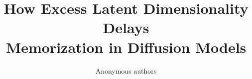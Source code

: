 \documentclass{article}
\title{How Excess Latent Dimensionality Delays\\ Memorization in Diffusion Models}
\author{Anonymous authors}
\theoremstyle{plain}
\theoremstyle{definition}
\theoremstyle{remark}
\begin{document}
\maketitle

\raggedbottom















\appendix
\onecolumn


\end{document}
